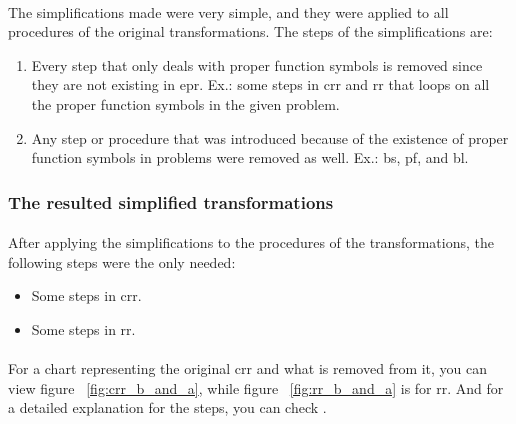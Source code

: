 		\paragraph{}
		The simplifications made were very simple, and they were applied to all procedures of the original transformations. The steps of the simplifications are:
		
			\begin{enumerate}
				\item Every step that only deals with proper function symbols is removed since they are not existing in \ac{epr}. Ex.: some steps in \ac{crr} and \ac{rr} that loops on all the proper function symbols in the given problem.
				\item Any step or procedure that was introduced because of the existence of proper function symbols in problems were removed as well. Ex.: \ac{bs}, \ac{pf}, and \ac{bl}.
			\end{enumerate}
		
	\subsubsection{The resulted simplified transformations}
		\paragraph{}
		After applying the simplifications to the procedures of the transformations, the following steps were the only needed:
			
			\begin{itemize}
				\item Some steps in \ac{crr}.
				\item Some steps in \ac{rr}.
			\end{itemize}
		
		\paragraph{}
		For a chart representing the original \ac{crr} and what is removed from it, you can view figure ~\ref{fig:crr_b_and_a}, while figure ~\ref{fig:rr_b_and_a} is for \ac{rr}. And for a detailed explanation for the steps, you can check \cite{BMUG06}. 
		

